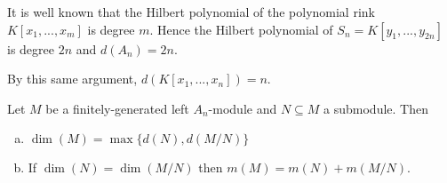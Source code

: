 \begin{example}\label{example:dim-of-Weyl-algebra}
	It is well known that the Hilbert polynomial of the polynomial rink $K[x_1,...,x_m]$ is degree $m$. Hence the Hilbert polynomial of $S_n = K[y_1,...,y_{2n}]$ is degree $2n$ and $d(A_n) = 2n$.

	By this same argument, $d(K[x_1,...,x_n]) = n$. 
\end{example}
\begin{prop}\label{prop:basic-dim-properties-A_n}
	Let $M$ be a finitely-generated left $A_n$-module and $N \subseteq M$ a submodule. Then
	\begin{enumerate}[(a)]
		\item $\dim(M) = \max\{d(N),d(M/N)\}$ 
		\item If $\dim(N) = \dim(M/N)$ then $m(M) = m(N) + m(M/N)$.
	\end{enumerate}
\end{prop}
